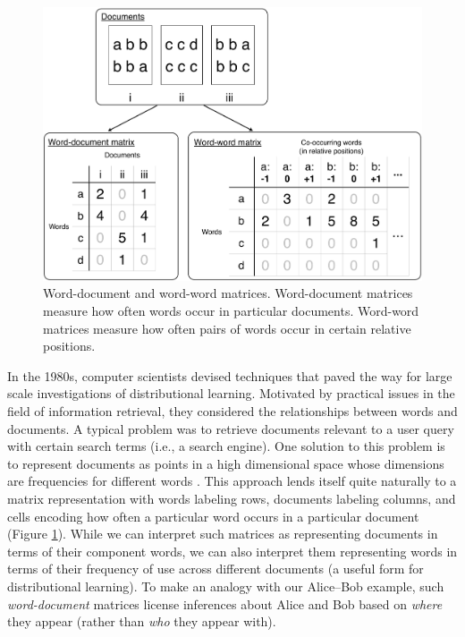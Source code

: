 \documentclass[man,floatsintext]{apa6}
\begin{document}
\begin{figure}[t]
  \begin{center}
    \includegraphics[width=0.9\linewidth]{matrices}
  \end{center}
  \caption{Word-document and word-word matrices. Word-document matrices measure how often words occur in particular documents. Word-word matrices measure how often pairs of words occur in certain relative positions.}
  \label{matrices}
\end{figure}

In the 1980s, computer scientists devised techniques that paved the way for large scale investigations of distributional learning. Motivated by practical issues in the field of information retrieval, they considered the relationships between words and documents. A typical problem was to retrieve documents relevant to a user query with certain search terms (i.e., a search engine). One solution to this problem is to represent documents as points in a high dimensional space whose dimensions are frequencies for different words \citep{salton1983}. This approach lends itself quite naturally to a matrix representation with words labeling rows, documents labeling columns, and cells encoding how often a particular word occurs in a particular document (Figure \ref{matrices}). While we can interpret such matrices as representing documents in terms of their component words, we can also interpret them representing words in terms of their frequency of use across different documents (a useful form for distributional learning). To make an analogy with our Alice--Bob example, such \emph{word-document} matrices license inferences about Alice and Bob based on \emph{where} they appear (rather than \emph{who} they appear with).
\end{document}
